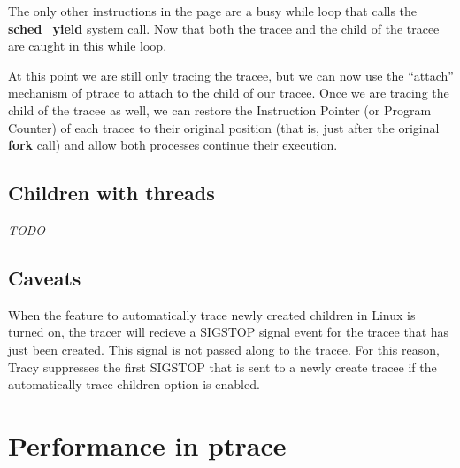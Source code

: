 \documentclass[a4paper, 10pt]{report}
\begin{document}
The only other instructions in the page are a busy while loop that
calls the \textbf{sched\_yield} system call.
Now that both the tracee and the child of the tracee are caught
in this while loop.

At this point we are still only tracing the tracee, but we can now use the
``attach'' mechanism of ptrace to attach to the child of our tracee. Once we are
tracing the child of the tracee as well, we can restore the Instruction Pointer
(or Program Counter) of each tracee to their original position
(that is, just after the original \textbf{fork} call) and allow both
processes continue their execution.



\subsection{Children with threads}

\textit{TODO}






\subsection{Caveats}

When the feature to automatically trace newly created children in Linux
is turned on, the tracer will recieve a SIGSTOP signal event for the tracee
that has just been created. This signal is not passed along to the tracee.
For this reason, Tracy suppresses the first SIGSTOP that is sent
to a newly create tracee if the automatically trace children option
is enabled.

\section{Performance in ptrace}
\label{ptrace-perf-problems}
\end{document}
